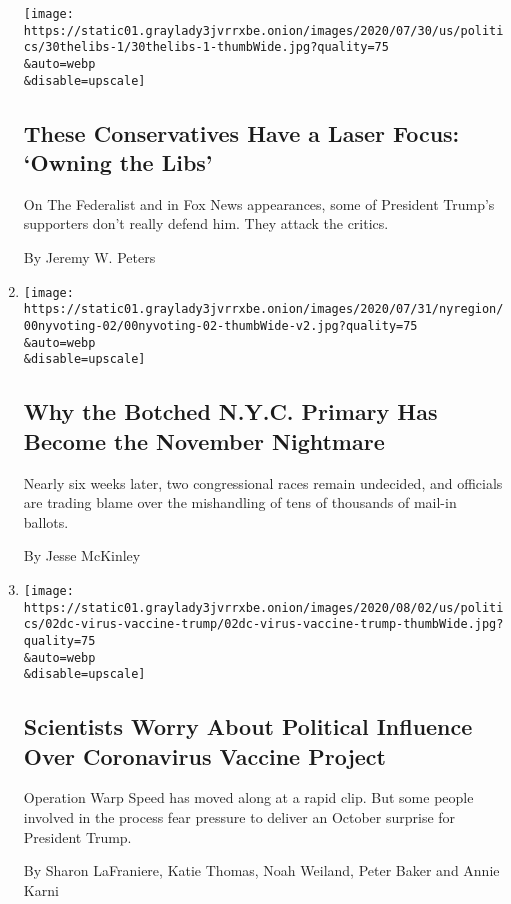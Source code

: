\begin{enumerate}
  \texttt{[image: https://static01.graylady3jvrrxbe.onion/images/2020/07/30/us/politics/30thelibs-1/30thelibs-1-thumbWide.jpg?quality=75\\\&auto=webp\\\&disable=upscale]}

  \hypertarget{these-conservatives-have-a-laser-focus-owning-the-libs}{%
  \subsection{These Conservatives Have a Laser Focus: `Owning the
  Libs'}\label{these-conservatives-have-a-laser-focus-owning-the-libs}}

  On The Federalist and in Fox News appearances, some of President
  Trump's supporters don't really defend him. They attack the critics.

  By Jeremy W. Peters
\item
  \href{/2020/08/03/nyregion/nyc-mail-ballots-voting.html}{}

  \texttt{[image: https://static01.graylady3jvrrxbe.onion/images/2020/07/31/nyregion/00nyvoting-02/00nyvoting-02-thumbWide-v2.jpg?quality=75\\\&auto=webp\\\&disable=upscale]}

  \hypertarget{why-the-botched-nyc-primary-has-become-the-november-nightmare}{%
  \subsection{Why the Botched N.Y.C. Primary Has Become the November
  Nightmare}\label{why-the-botched-nyc-primary-has-become-the-november-nightmare}}

  Nearly six weeks later, two congressional races remain undecided, and
  officials are trading blame over the mishandling of tens of thousands
  of mail-in ballots.

  By Jesse McKinley
\item
  \href{/2020/08/02/us/politics/coronavirus-vaccine.html}{}

  \texttt{[image: https://static01.graylady3jvrrxbe.onion/images/2020/08/02/us/politics/02dc-virus-vaccine-trump/02dc-virus-vaccine-trump-thumbWide.jpg?quality=75\\\&auto=webp\\\&disable=upscale]}

  \hypertarget{scientists-worry-about-political-influence-over-coronavirus-vaccine-project}{%
  \subsection{Scientists Worry About Political Influence Over
  Coronavirus Vaccine
  Project}\label{scientists-worry-about-political-influence-over-coronavirus-vaccine-project}}

  Operation Warp Speed has moved along at a rapid clip. But some people
  involved in the process fear pressure to deliver an October surprise
  for President Trump.

  By Sharon LaFraniere, Katie Thomas, Noah Weiland, Peter Baker and
  Annie Karni
\end{enumerate}


